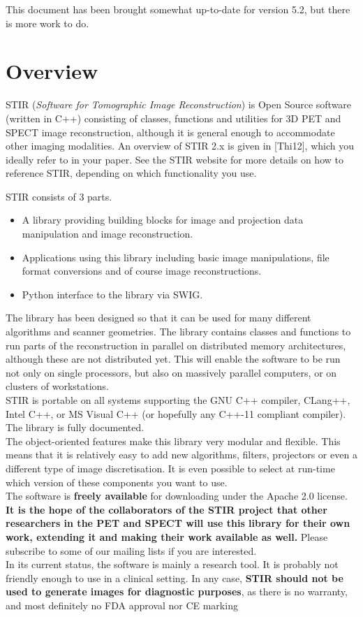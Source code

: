 \documentclass{article}
\begin{document}
This document has been brought somewhat up-to-date for version 5.2, but there is more work to do.

\section{
Overview}

STIR (\textit{Software for Tomographic Image Reconstruction}) is Open 
Source software (written in C++) consisting of classes, functions 
and utilities for 3D PET and SPECT image reconstruction, although it is 
general enough to accommodate other imaging modalities. An overview
of STIR 2.x is given in [Thi12], which you ideally refer to in your paper.
See the STIR website for more details on how to reference STIR, depending on which functionality you use.

STIR consists of 3 parts. 
\begin{itemize}
\item
A library providing building blocks for image and projection 
data manipulation and image reconstruction.
\item
Applications using this library including basic image manipulations, 
file format conversions and of course image reconstructions.
\item Python interface to the library via SWIG.
\end{itemize}

The library has been designed so that it can be used for many 
different algorithms and scanner geometries. The library contains 
classes and functions to run parts of the reconstruction in parallel 
on distributed memory architectures, although these are not distributed 
yet. This will enable the software to be run not only on single 
processors, but also on massively parallel computers, or on clusters 
of workstations. \\
STIR is portable on all systems supporting the GNU C++ compiler, CLang++, Intel C++, 
or MS Visual C++ (or hopefully any C++-11 compliant compiler). 
The library is fully documented.\\
The object-oriented features make this library very modular and 
flexible. This means that it is relatively easy to add new algorithms, 
filters, projectors or even a different type of image discretisation. 
It is even possible to select at run-time which version of these 
components you want to use.\\
The software is \textbf{freely available} for downloading under the 
Apache 2.0 license.\\
\textbf{It is the hope of the collaborators of the STIR project that 
other researchers in the PET and SPECT will use this library 
for their own work, extending it and making their work available 
as well.} Please subscribe to some of our mailing 
lists if you are interested. \\
In its current status, the software is mainly a research tool. 
It is probably not friendly enough to use in a clinical setting. In any 
case, \textbf{STIR should not be used to generate images for diagnostic
purposes}, as there is no warranty, and most definitely no FDA approval nor CE marking
\end{document}
